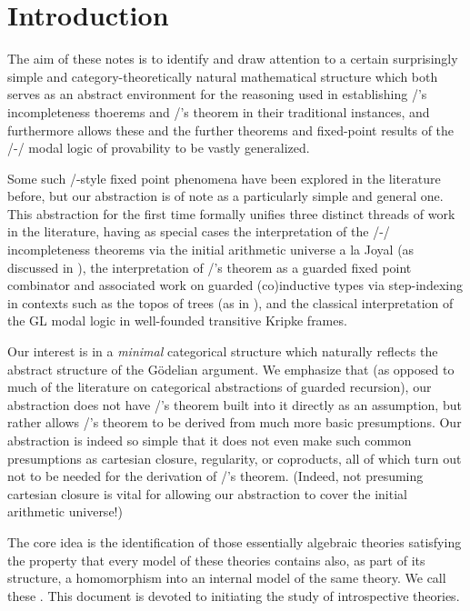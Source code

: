\filestart

\section{Introduction}
The aim of these notes is to identify and draw attention to a certain surprisingly simple and category-theoretically natural mathematical structure which both serves as an abstract environment for the reasoning used in establishing \Goedel/'s incompleteness thoerems and \Loeb/'s theorem in their traditional instances, and furthermore allows these and the further theorems and fixed-point results of the \Goedel/-\Loeb/ modal logic of provability to be vastly generalized.

Some such \Loeb/-style fixed point phenomena have been explored in the literature before, but our abstraction is of note as a particularly simple and general one. This abstraction for the first time formally unifies three distinct threads of work in the literature, having as special cases the interpretation of the \Goedel/-\Loeb/ incompleteness theorems via the initial arithmetic universe a la Joyal (as discussed in \autocite{van2020g}), the interpretation of \Loeb/'s theorem as a guarded fixed point combinator and associated work on guarded (co)inductive types via step-indexing in contexts such as the topos of trees (as in \autocite{birkedal2011first}), and the classical interpretation of the GL modal logic in well-founded transitive Kripke frames.

Our interest is in a \emph{minimal} categorical structure which naturally reflects the abstract structure of the G\"odelian argument. We emphasize that (as opposed to much of the literature on categorical abstractions of guarded recursion), our abstraction does not have \Loeb/'s theorem built into it directly as an assumption, but rather allows \Loeb/'s theorem to be derived from much more basic presumptions. Our abstraction is indeed so simple that it does not even make such common presumptions as cartesian closure, regularity, or coproducts, all of which turn out not to be needed for the derivation of \Loeb/'s theorem. (Indeed, not presuming cartesian closure is vital for allowing our abstraction to cover the initial arithmetic universe!)

The core idea is the identification of those essentially algebraic theories satisfying the property that every model of these theories contains also, as part of its structure, a homomorphism into an internal model of the same theory. We call these . This document is devoted to initiating the study of introspective theories.

